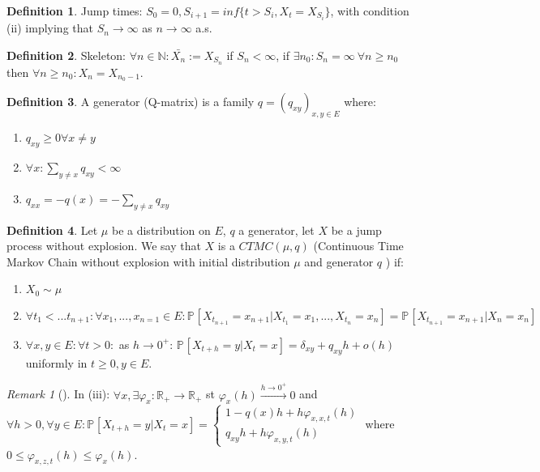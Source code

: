 \documentclass[12pt]{book}
\theoremstyle{definition}
\newtheorem{defn}{Definition}[section]
\theoremstyle{remark}
\newtheorem{rmk}[theorem]{Remark}
\begin{document}
\begin{defn}
	Jump times: $S_0 =0, S_{i+1} = inf\{t > S_i, X_t = X_{S_i}\}$, with condition (ii) implying that $S_n \to \infty $ as $n \to \infty $ a.s.
\end{defn}

\begin{defn}
	Skeleton: $\forall n \in \mathbb{N}: \bar{X_n} := X_{S_n}$ if $S _n< \infty$, if $\exists n_0: S_n = \infty \ \forall n \geq n_0$ then $\forall n \geq n_0: X_n = X_{n_0 -1}$.
\end{defn}

\begin{defn}
	A generator (Q-matrix) is a family $q=(q_{xy})_{x,y \in E}$ where:
	\begin{enumerate}
		\item $q_{xy} \geq 0 \forall x \neq y$
		\item $\forall x: \sum_{y \neq x}^{} q_{xy} < \infty$
		\item $q_{xx}= -q(x) =  -\sum_{y \neq x}^{} q_{xy}$
\end{enumerate}

\end{defn}


\begin{defn}
	Let $\mu $ be a distribution on $E$, $q$ a generator, let $X$ be a jump process without explosion. We say that $X$ is a $CTMC(\mu, q)$ (Continuous Time Markov Chain without explosion with initial distribution $\mu $ and generator $q$ ) if:
\begin{enumerate}
	\item $X_0 \sim \mu $ 
	\item $\forall t_1 <...t_{n+1}: \forall x_1,...,x_{n=1} \in E: \mathbb{P}_{} \left[ X_{t_{n+1}} = x_{n+1} | 
		X_{t_1}=x_1,...,X_{t_{n}}=x_n \right] = \mathbb{P}_{} \left[ X_{t_{n+1}} = x_{n+1} | X_{n}=x_n \right] $
	\item $\forall x,y \in  E: \forall t> 0:$ as $h \to 0^+$:  $\mathbb{P}_{} \left[ X_{t+h}=y | X _{t}=x \right]  = \delta_{xy} + q_{xy}h + o(h)$ uniformly in $t\geq 0, y \in E$.
\end{enumerate}

\end{defn}

\begin{rmk}[]
	In (iii): $\forall x, \exists \varphi_x: \mathbb{R}_+ \to \mathbb{R}_+$ st $\varphi_x(h) \stackrel{h \to 0^+}{\to}0$ and $\forall h> 0, \forall y \in E: \mathbb{P}_{} \left[ X_{t+h}=y |  X_{t}=x \right] = 
	\begin{cases}
		1 - q(x)h + h \varphi_{x,x,t}(h) \\
		q_{xy}h + h \varphi_{x,y,t}(h)
	\end{cases}
	$ where $0 \leq \varphi_{x,z,t}(h) \leq \varphi_x(h)$.
\end{rmk}
\end{document}
